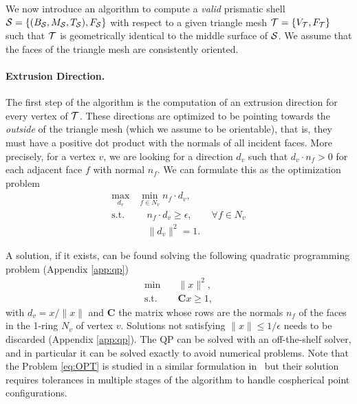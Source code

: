 We now introduce an algorithm to compute a \emph{valid} prismatic shell $\S = \{(B_\S,M_\S,T_\S),F_\S\}$ with respect to a given triangle mesh $\T = \{V_\T,F_\T\}$ such that $\T$ is geometrically identical to the middle surface of $\S$.  We assume that the faces of the triangle mesh are consistently oriented.

\paragraph{Extrusion Direction.} The first step of the algorithm is the computation of an extrusion direction for every vertex of $\T$. These directions are optimized to be pointing towards the \emph{outside} of the triangle mesh (which we assume to be orientable), that is,
they must have a positive dot product with the normals of all incident faces. More precisely, for a vertex $v$, we are looking for a direction $d_v$ such that $d_v \cdot n_f > 0$ for each adjacent face $f$ with normal $n_f$. We can formulate this as the optimization problem
\begin{equation}
\label{eq:OPT}
\begin{split}
    \max_{d_v}& \min_{f \in N_v} n_f \cdot d_v,\\
    \text{s.t. }&\quad n_f \cdot d_v \geq {\epsilon}, \qquad \forall f \in N_v\\
               &\quad  \|d_v\|^2 = 1.
\end{split}
\end{equation}

A solution, if it exists, can be found solving the following quadratic programming problem (Appendix \ref{app:qp})
\begin{equation}
\label{eq:QP}
\begin{split}
    \min&\quad \|x\|^2,  \\
    \text{s.t.}&\quad \mathbf{C} x \geq 1,
\end{split}
\end{equation}
with $d_v = x / \|x\|$ and $\mathbf{C}$ the matrix whose rows are the normals $n_f$ of the faces in the 1-ring $N_v$ of vertex $v$. Solutions not satisfying $\|x\| \leq 1/\epsilon$ needs to be discarded (Appendix \ref{app:qp}). The QP can be solved with an off-the-shelf solver\cite{osqp,cheshmi2020nasoq}, and in particular it can be solved exactly \cite{gartner2000efficient} to avoid numerical problems. Note that the Problem \eqref{eq:OPT} is studied in a similar formulation in~\cite{aubry2008most} but their solution requires tolerances in multiple stages of the algorithm to handle cospherical point configurations.


